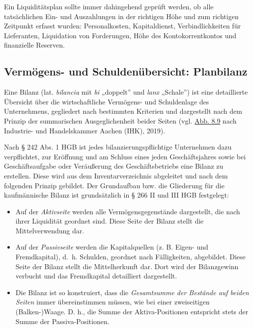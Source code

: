 \documentclass[
  letterpaper,
]{book}
\begin{document}
Ein Liquiditätsplan sollte immer dahingehend geprüft werden, ob alle
tatsächlichen Ein- und Auszahlungen in der richtigen Höhe und zum
richtigen Zeitpunkt erfasst wurden: Personalkosten, Kapitaldienst,
Verbindlichkeiten für Lieferanten, Liquidation von Forderungen, Höhe des
Kontokorrentkontos und finanzielle Reserven.

\subsection{Vermögens- und Schuldenübersicht:
Planbilanz}\label{vermgens--und-schuldenbersicht-planbilanz}

Eine Bilanz (lat. \emph{bilancia} mit \emph{bi} „doppelt'' und
\emph{lanx} „Schale'') ist eine detaillierte Übersicht über die
wirtschaftliche Vermögens- und Schuldenlage des Unternehmens, gegliedert
nach bestimmten Kriterien und dargestellt nach dem Prinzip der
summarischen Ausgeglichenheit beider Seiten (vgl.
\hyperref[figure89]{Abb. 8.9} nach Industrie- und Handelskammer Aachen
(IHK), 2019).

Nach § 242 Abs. 1 HGB ist jedes bilanzierungspflichtige Unternehmen dazu
verpflichtet, zur Eröffnung und am Schluss eines jeden Geschäftsjahres
sowie bei Geschäftsaufgabe oder Veräußerung des Geschäftsbetriebs eine
Bilanz zu erstellen. Diese wird aus dem Inventarverzeichnis abgeleitet
und nach dem folgenden Prinzip gebildet. Der Grundaufbau bzw. die
Gliederung für die kaufmännische Bilanz ist grundsätzlich in § 266 II
und III HGB festgelegt:

\begin{itemize}
\item
  Auf der \emph{Aktivseite} werden alle Vermögensgegenstände
  dargestellt, die nach ihrer Liquidität geordnet sind. Diese Seite der
  Bilanz stellt die Mittelverwendung dar.
\item
  Auf der \emph{Passivseite} werden die Kapitalquellen (z. B. Eigen- und
  Fremdkapital), d.~h. Schulden, geordnet nach Fälligkeiten, abgebildet.
  Diese Seite der Bilanz stellt die Mittelherkunft dar. Dort wird der
  Bilanzgewinn verbucht und das Fremdkapital detailliert dargestellt.
\item
  Die Bilanz ist so konstruiert, dass die \emph{Gesamtsumme der Bestände
  auf beiden Seiten} immer übereinstimmen müssen, wie bei einer
  zweiseitigen (Balken-)Waage. D. h., die Summe der Aktiva-Positionen
  entspricht stets der Summe der Passiva-Positionen.
\end{itemize}
\end{document}
